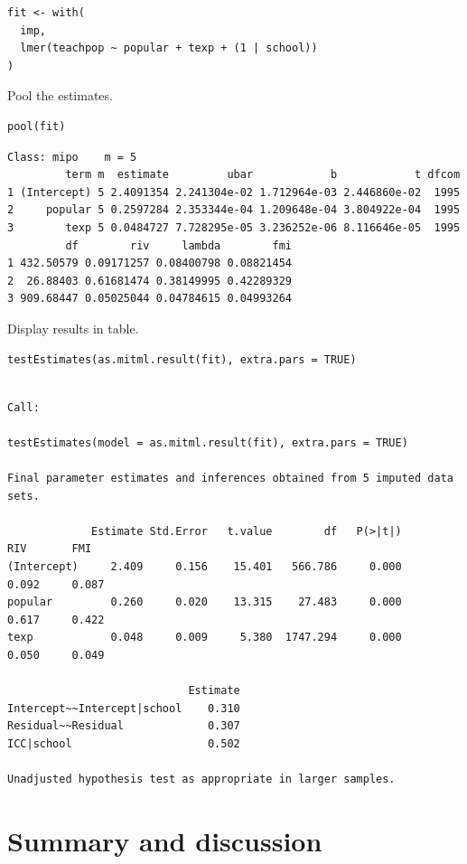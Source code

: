 \documentclass[
  article]{jss}
\begin{document}
\begin{verbatim}
fit <- with(
  imp,
  lmer(teachpop ~ popular + texp + (1 | school))
)
\end{verbatim}

Pool the estimates.

\begin{verbatim}
pool(fit)
\end{verbatim}

\begin{verbatim}
Class: mipo    m = 5 
         term m  estimate         ubar            b            t dfcom
1 (Intercept) 5 2.4091354 2.241304e-02 1.712964e-03 2.446860e-02  1995
2     popular 5 0.2597284 2.353344e-04 1.209648e-04 3.804922e-04  1995
3        texp 5 0.0484727 7.728295e-05 3.236252e-06 8.116646e-05  1995
         df        riv     lambda        fmi
1 432.50579 0.09171257 0.08400798 0.08821454
2  26.88403 0.61681474 0.38149995 0.42289329
3 909.68447 0.05025044 0.04784615 0.04993264
\end{verbatim}

Display results in table.

\begin{verbatim}
testEstimates(as.mitml.result(fit), extra.pars = TRUE)
\end{verbatim}

\begin{verbatim}

Call:

testEstimates(model = as.mitml.result(fit), extra.pars = TRUE)

Final parameter estimates and inferences obtained from 5 imputed data sets.

             Estimate Std.Error   t.value        df   P(>|t|)       RIV       FMI 
(Intercept)     2.409     0.156    15.401   566.786     0.000     0.092     0.087 
popular         0.260     0.020    13.315    27.483     0.000     0.617     0.422 
texp            0.048     0.009     5.380  1747.294     0.000     0.050     0.049 

                            Estimate 
Intercept~~Intercept|school    0.310 
Residual~~Residual             0.307 
ICC|school                     0.502 

Unadjusted hypothesis test as appropriate in larger samples.
\end{verbatim}

\hypertarget{sec-summary}{%
\section{Summary and discussion}\label{sec-summary}}
\end{document}
